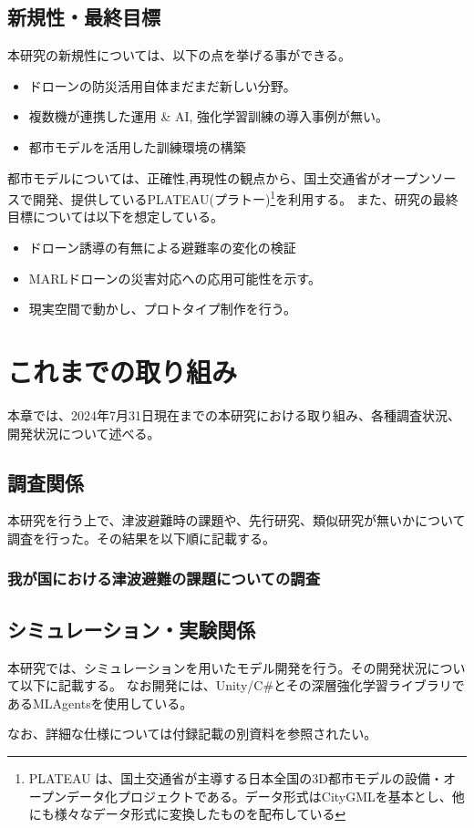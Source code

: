 \documentclass{article}[jsarticle]
\begin{document}
\subsection{新規性・最終目標}
本研究の新規性については、以下の点を挙げる事ができる。
\begin{itemize}
    \item ドローンの防災活用自体まだまだ新しい分野。
    \item 複数機が連携した運用 \& AI, 強化学習訓練の導入事例が無い。
    \item 都市モデルを活用した訓練環境の構築
\end{itemize}
都市モデルについては、正確性,再現性の観点から、国土交通省がオープンソースで開発、提供しているPLATEAU(プラトー)\footnote{PLATEAU は、国土交通省が主導する日本全国の3D都市モデルの設備・オープンデータ化プロジェクトである。データ形式はCityGMLを基本とし、他にも様々なデータ形式に変換したものを配布している}を利用する。
また、研究の最終目標については以下を想定している。
\begin{itemize}
    \item ドローン誘導の有無による避難率の変化の検証
    \item MARLドローンの災害対応への応用可能性を示す。
    \item 現実空間で動かし、プロトタイプ制作を行う。
\end{itemize}

\section{これまでの取り組み}
本章では、2024年7月31日現在までの本研究における取り組み、各種調査状況、開発状況について述べる。
\subsection{調査関係}
本研究を行う上で、津波避難時の課題や、先行研究、類似研究が無いかについて調査を行った。その結果を以下順に記載する。
\subsubsection{我が国における津波避難の課題についての調査}
\label{sec:research-sec1}

\subsection{シミュレーション・実験関係}
本研究では、シミュレーションを用いたモデル開発を行う。その開発状況について以下に記載する。
なお開発には、Unity/C\#とその深層強化学習ライブラリであるML\-Agentsを使用している。\par 
なお、詳細な仕様については付録記載の別資料を参照されたい。
\end{document}

